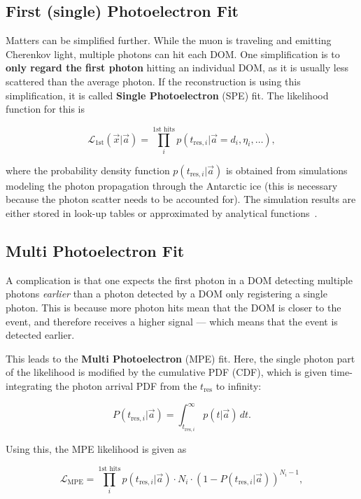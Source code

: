 \subsection{First (single) Photoelectron Fit}
Matters can be simplified further. While the muon is traveling and emitting Cherenkov light, multiple photons can hit each DOM\@. One simplification is to \textbf{only regard the first photon} hitting an individual DOM, as it is usually less scattered than the average photon. If the reconstruction is using this simplification, it is called \textbf{Single Photoelectron} (SPE) fit. The likelihood function for this is

\begin{equation}
    \mathcal{L}_\text{1st}(\vec{x}|\vec{a}) = \prod_i^\text{1st hits} p(t_{\text{res},i}|\vec{a}=d_i, \eta_i,\ldots),
\end{equation}

where the probability density function $p(t_{\text{res},i}|\vec{a})$ is obtained from simulations modeling the photon propagation through the Antarctic ice (this is necessary because the photon scatter needs to be accounted for). The simulation results are either stored in look-up tables or approximated by analytical functions~\cite{Ahrens2004}.

\subsection{Multi Photoelectron Fit}
A complication is that one expects the first photon in a DOM detecting multiple photons \textit{earlier} than a photon detected by a DOM only registering a single photon. This is because more photon hits mean that the DOM is closer to the event, and therefore receives a higher signal --- which means that the event is detected earlier.

This leads to the \textbf{Multi Photoelectron} (MPE) fit. Here, the single photon part of the likelihood is modified by the cumulative PDF (CDF), which is given time-integrating the photon arrival PDF from the $t_\text{res}$ to infinity:

\begin{equation}
    P(t_{\text{res},i}|\vec{a}) = \int^{\infty}_{t_{\text{res},i}}p(t|\vec{a})\,dt.
\end{equation}

Using this, the MPE likelihood is given as

\begin{equation}
    \mathcal{L}_\text{MPE} = \prod_i^\text{1st hits} p(t_{\text{res},i}|\vec{a}) \cdot N_i \cdot (1-P(t_{\text{res},i}|\vec{a}))^{N_i-1},
\end{equation}

